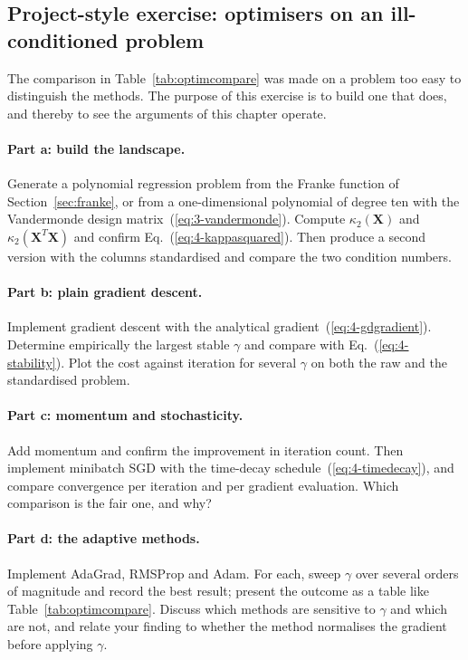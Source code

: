 \subsection*{Project-style exercise: optimisers on an ill-conditioned problem}

The comparison in Table~\ref{tab:optimcompare} was made on a problem too easy
to distinguish the methods.  The purpose of this exercise is to build one that
does, and thereby to see the arguments of this chapter operate.

\paragraph{Part a: build the landscape.}
Generate a polynomial regression problem from the Franke function of
Section~\ref{sec:franke}, or from a one-dimensional polynomial of degree ten
with the Vandermonde design matrix~(\ref{eq:3-vandermonde}).  Compute
$\kappa_2(\bm{X})$ and $\kappa_2(\bm{X}^{T}\bm{X})$ and confirm
Eq.~(\ref{eq:4-kappasquared}).  Then produce a second version with the columns
standardised and compare the two condition numbers.

\paragraph{Part b: plain gradient descent.}
Implement gradient descent with the analytical
gradient~(\ref{eq:4-gdgradient}).  Determine empirically the largest stable
$\gamma$ and compare with Eq.~(\ref{eq:4-stability}).  Plot the cost against
iteration for several $\gamma$ on both the raw and the standardised problem.

\paragraph{Part c: momentum and stochasticity.}
Add momentum and confirm the improvement in iteration count.  Then implement
minibatch SGD with the time-decay schedule~(\ref{eq:4-timedecay}), and compare
convergence per iteration and per gradient evaluation.  Which comparison is
the fair one, and why?

\paragraph{Part d: the adaptive methods.}
Implement AdaGrad, RMSProp and Adam.  For each, sweep $\gamma$ over several
orders of magnitude and record the best result; present the outcome as a table
like Table~\ref{tab:optimcompare}.  Discuss which methods are sensitive to
$\gamma$ and which are not, and relate your finding to whether the method
normalises the gradient before applying $\gamma$.

